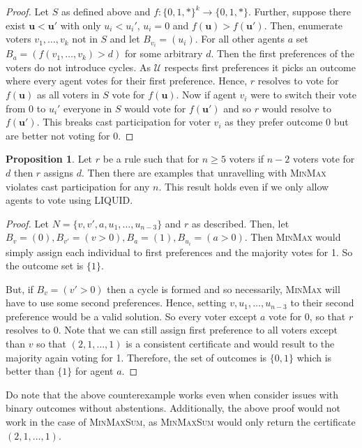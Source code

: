 \documentclass[11pt,a4paper, titlepage]{article}
\theoremstyle{definition}
\newtheorem{proposition}[theorem]{Proposition}
\let\vec\mathbf
\begin{document}
\begin{proof}
    Let $S$ as defined above and $f: \{0, 1, *\}^k \longrightarrow \{0,1, *\}$.
    Further, suppose there exist $\vec{u} < \vec{u}'$ with only $u_i < u_i'$, $u_i = 0$ and $f(\vec{u}) > f(\vec{u}')$. Then, enumerate voters $v_1, \ldots, v_k$ not in $S$ and let $B_{v_i} = (u_i)$. 
    For all other agents $a$ set $B_{a} = (f(v_1, \ldots, v_k) > d)$ for some arbitrary $d$. 
    Then the first preferences of the voters do not introduce cycles. 
    As $\mathcal{U}$ respects first preferences it picks an outcome where every agent votes for their first preference.
    Hence, $r$ resolves to vote for $f(\vec{u})$ as all voters in $S$ vote for $f(\vec{u})$.
    Now if agent $v_i$ were to switch their vote from $0$ to $u_i'$ everyone in $S$ would vote for $f(\vec{u}')$ and so $r$ would resolve to $f(\vec{u}')$. This breaks cast participation for voter $v_i$ as they prefer outcome 0 but are better not voting for 0.
\end{proof}

\begin{proposition}
    \label{prop:cast-max}
    Let $r$ be a rule such that for $n \geq 5$ voters if $n-2$ voters vote for $d$ then $r$ assigns $d$. Then there are examples that unravelling with \textsc{MinMax} violates cast participation for any $n$. This result holds even if we only allow agents to vote using LIQUID.
\end{proposition}

\begin{proof}
    Let $N = \{v, v', a, u_1, \ldots, u_{n-3}\}$ and $r$ as described. Then, let $B_v = (0), B_{v'} = (v > 0), B_a = (1), B_{u_i} = (a > 0)$. Then \textsc{MinMax} would simply assign each individual to first preferences and the majority votes for 1. So the outcome set is $\{1\}$.

    But, if $B_v = (v' > 0)$ then a cycle is formed and so necessarily, \textsc{MinMax} will have to use some second preferences. Hence, setting $v, u_1, \ldots, u_{n-3}$ to their second preference would be a valid solution. So every voter except $a$ vote for $0$, so that $r$ resolves to $0$. 
    Note that we can still assign first preference to all voters except than $v$ so that $(2, 1, \ldots, 1)$ is a consistent certificate and would result to the majority again voting for 1. 
    Therefore, the set of outcomes is $\{0, 1\}$ which is better than $\{1\}$ for agent $a$.
\end{proof}

Do note that the above counterexample works even when consider issues with binary outcomes without abstentions.
Additionally, the above proof would not work in the case of \textsc{MinMaxSum}, as \textsc{MinMaxSum} would only return the certificate $(2, 1, \ldots, 1)$.
\end{document}
